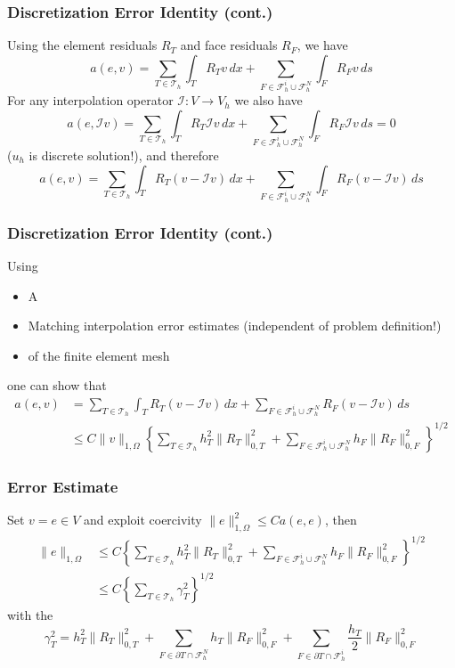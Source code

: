 \documentclass[aspectratio=169,11pt]{beamer}
\theoremstyle{definition}
\begin{document}
\begin{frame}
\frametitle{Discretization Error Identity (cont.)}
Using the element residuals $R_T$ and face residuals $R_F$, we have
\begin{equation*}
  a(e,v) = \sum_{T \in \mathcal{T}_h} \int_T R_T v \,dx + \sum_{F \in \mathcal{F}_h^i \cup \mathcal{F}_h^N} \int_F R_F v \,ds
\end{equation*}
For any interpolation operator $\mathcal{I} \colon V \to V_h$ we also have
\begin{equation*}
  a(e,\mathcal{I}v) = \sum_{T \in \mathcal{T}_h} \int_T R_T \mathcal{I} v \,dx + \sum_{F \in \mathcal{F}_h^i \cup \mathcal{F}_h^N} \int_F R_F \mathcal{I} v \,ds = 0
\end{equation*}
($u_h$ is discrete solution!), and therefore
\begin{equation*}
  a(e,v) = \sum_{T \in \mathcal{T}_h} \int_T R_T (v - \mathcal{I} v) \,dx + \sum_{F \in \mathcal{F}_h^i \cup \mathcal{F}_h^N} \int_F R_F (v - \mathcal{I} v) \,ds
\end{equation*}
\end{frame}

\begin{frame}
\frametitle{Discretization Error Identity (cont.)}
Using
\begin{itemize}
  \item A 
  \item Matching interpolation error estimates (independent of problem definition!)
  \item {} of the finite element mesh
\end{itemize}
one can show that
\begin{align*}
  a(e,v) &= \sum_{T \in \mathcal{T}_h} \int_T R_T (v - \mathcal{I} v) \,dx + \sum_{F \in \mathcal{F}_h^i \cup \mathcal{F}_h^N} R_F (v - \mathcal{I} v) \,ds \\
  &\leq C \| v \|_{1,\Omega} {\left\{ \sum_{T \in \mathcal{T}_h} h_T^2 \|R_T\|_{0,T}^2 + \sum_{F \in \mathcal{F}_h^i \cup \mathcal{F}_h^N} h_F \| R_F \|_{0,F}^2 \right\}}^{1/2}
\end{align*}
\end{frame}

\begin{frame}
\frametitle{Error Estimate}
Set $v = e \in V$ and exploit coercivity $\|e\|_{1,\Omega}^2 \leq C a(e,e)$, then
\begin{align*}
  \|e\|_{1,\Omega} &\leq C {\left\{ \sum_{T \in \mathcal{T}_h} h_T^2 \|R_T\|_{0,T}^2 + \sum_{F \in \mathcal{F}_h^i \cup \mathcal{F}_h^N} h_F \|R_F\|_{0,F}^2 \right\}}^{1/2} \\
  &\leq C {\left\{ \sum_{T \in \mathcal{T}_h} \gamma_T^2 \right\}}^{1/2}
\end{align*}
with the 
\begin{equation*}
  \gamma_T^2 = h_T^2 \|R_T\|_{0,T}^2 + \sum_{F \in \partial T \cap \mathcal{F}_h^N} h_T \|R_F\|_{0,F}^2 + \sum_{F \in \partial T \cap \mathcal{F}_h^i} \frac{h_T}{2} \|R_F\|_{0,F}^2
\end{equation*}
\end{frame}
\end{document}
